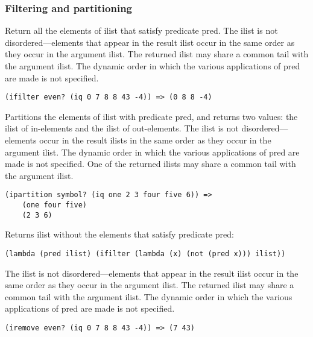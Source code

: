 \subsubsection{{Filtering and partitioning}}

\begin{entry}{%
  }

  Return all
  the elements of ilist that satisfy predicate pred. The ilist is not
  disordered---elements that appear in the result ilist occur in the
  same order as they occur in the argument ilist. The returned ilist
  may share a common tail with the argument ilist. The dynamic order
  in which the various applications of pred are made is not specified.

\begin{verbatim}
(ifilter even? (iq 0 7 8 8 43 -4)) => (0 8 8 -4)
\end{verbatim}
\end{entry}

\begin{entry}{%
  }

  Partitions the elements of ilist with predicate pred, and
  returns two values: the ilist of in-elements and the ilist of
  out-elements. The ilist is not disordered---elements occur in the
  result ilists in the same order as they occur in the argument
  ilist. The dynamic order in which the various applications of pred
  are made is not specified. One of the returned ilists may share a
  common tail with the argument ilist.

\begin{verbatim}
(ipartition symbol? (iq one 2 3 four five 6)) => 
    (one four five)
    (2 3 6)
\end{verbatim}
\end{entry}

\begin{entry}{%
  }

  Returns
  ilist without the elements that satisfy predicate pred:

\begin{verbatim}
(lambda (pred ilist) (ifilter (lambda (x) (not (pred x))) ilist))
\end{verbatim}

  The ilist is not disordered---elements that appear in the result
  ilist occur in the same order as they occur in the argument
  ilist. The returned ilist may share a common tail with the argument
  ilist. The dynamic order in which the various applications of pred
  are made is not specified.

\begin{verbatim}
(iremove even? (iq 0 7 8 8 43 -4)) => (7 43)
\end{verbatim}
\end{entry}

